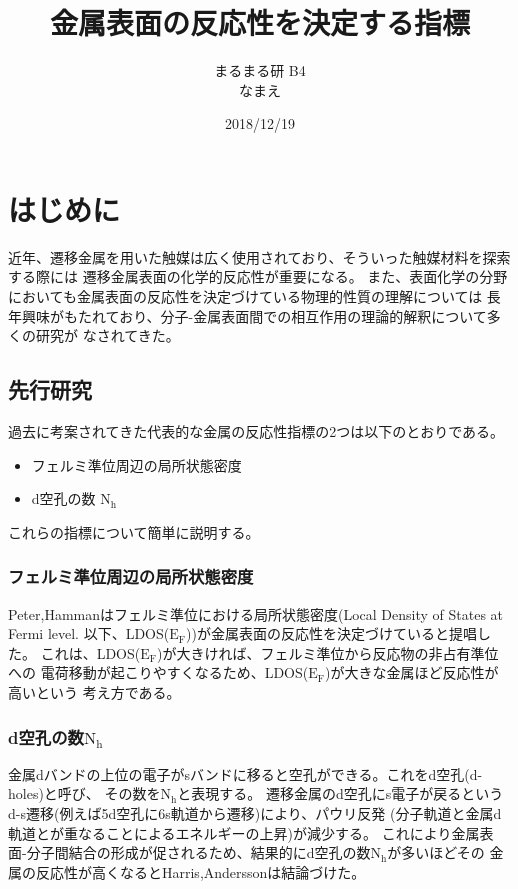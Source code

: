 \documentclass[12pt]{ltjsarticle}
\begin{document}
\begin{titlepage}
\title{金属表面の反応性を決定する指標}
\author{まるまる研 B4 \\ なまえ}
\date{2018/12/19}
\maketitle
\tableofcontents
\end{titlepage}

\section{はじめに}
近年、遷移金属を用いた触媒は広く使用されており、そういった触媒材料を探索する際には
遷移金属表面の化学的反応性が重要になる。
また、表面化学の分野においても金属表面の反応性を決定づけている物理的性質の理解については
長年興味がもたれており、分子-金属表面間での相互作用の理論的解釈について多くの研究が
なされてきた。 \\

\subsection{先行研究}

過去に考案されてきた代表的な金属の反応性指標の2つは以下のとおりである。
\begin{itemize}
 \item フェルミ準位周辺の局所状態密度
 \item d空孔の数 $\text{N}_\text{h}$
\end{itemize}

これらの指標について簡単に説明する。

\subsubsection{フェルミ準位周辺の局所状態密度}
Peter,Hammanはフェルミ準位における局所状態密度(Local Density of States at Fermi level.
以下、LDOS($\text{E}_\text{F}$))が金属表面の反応性を決定づけていると提唱した。
これは、LDOS($\text{E}_\text{F}$)が大きければ、フェルミ準位から反応物の非占有準位への
電荷移動が起こりやすくなるため、LDOS($\text{E}_\text{F}$)が大きな金属ほど反応性が高いという
考え方である。\cite{PeterJ.Feibelman1984}

\subsubsection{d空孔の数$\text{N}_\text{h}$}
金属dバンドの上位の電子がsバンドに移ると空孔ができる。これをd空孔(d-holes)と呼び、
その数を$\text{N}_\text{h}$と表現する。
遷移金属のd空孔にs電子が戻るというd-s遷移(例えば5d空孔に6s軌道から遷移)により、パウリ反発
(分子軌道と金属d軌道とが重なることによるエネルギーの上昇)が減少する。\cite{MORIKAWA2006}
これにより金属表面-分子間結合の形成が促されるため、結果的にd空孔の数$\text{N}_\text{h}$が多いほどその
金属の反応性が高くなるとHarris,Anderssonは結論づけた。\cite{J.Harris1985}
\end{document}
